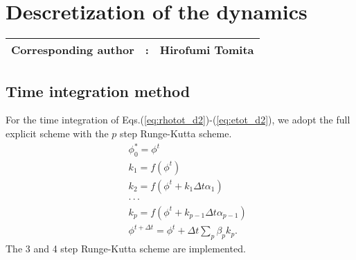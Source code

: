 \chapter{Descretization of the dynamics}
\label{chap:descretization dynamics}
{\bf \Large
\begin{tabular}{ccc}
\hline
  Corresponding author & : & Hirofumi Tomita\\
\hline
\end{tabular}
}

\section{Time integration method}

For the time integration of Eqs.(\ref{eq:rhotot_d2})-(\ref{eq:etot_d2}),
we adopt the full explicit scheme with
the $p$ step Runge-Kutta scheme.
\begin{eqnarray}
&& \phi^{*}_{0} = \phi^{t}\\
&& k_1 = f(\phi^t) \\
&& k_2 = f(\phi^t + k_1 \Delta t \alpha_1) \\
&&  \cdot \cdot \cdot\nonumber\\
&& k_p = f(\phi^t + k_{p-1} \Delta t \alpha_{p-1}) \\
&& \phi^{t+\Delta t} = \phi^t + \Delta t\sum_p \beta_p k_p.
\end{eqnarray}
The 3 and 4 step Runge-Kutta scheme are implemented.


